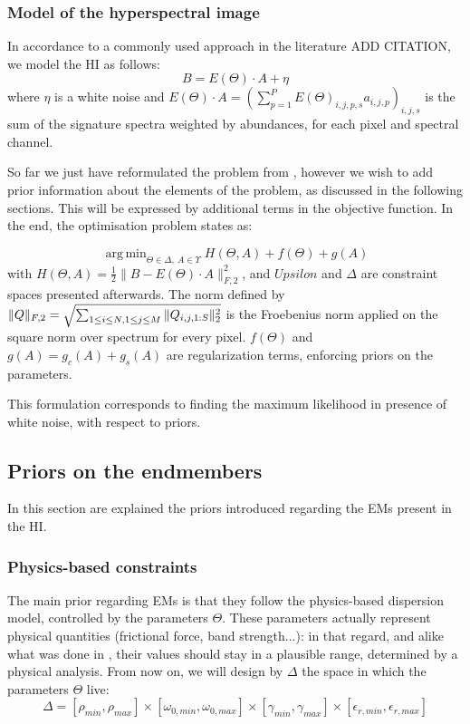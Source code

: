 \documentclass{article}
\DeclareMathOperator*{\argmin}{arg\,min}
\begin{document}
\subsubsection{Model of the hyperspectral image}

In accordance to a commonly used approach in the literature ADD CITATION, we model the HI as follows:
$$B = E(\Theta) \cdot A + \eta$$
where $\eta$ is a white noise and $E(\Theta) \cdot A = \left( \sum_{p=1}^P E(\Theta)_{i,j,p,s} a_{i,j,p} \right)_{i,j,s}$ is the sum of the signature spectra weighted by abundances, for each pixel and spectral channel.

So far we just have reformulated the problem from \cite{janiczek_differentiable_2020}, however we wish to add prior information about the elements of the problem, as discussed in the following sections. This will be expressed by additional terms in the objective function. In the end, the optimisation problem states as:

\begin{equation}
  \label{eq:objective}
  \argmin_{\Theta \in \Delta,\ A \in \Upsilon} H(\Theta, A) + f(\Theta) + g(A)
\end{equation}
with $H(\Theta, A) = \frac{1}{2} \|B - E(\Theta) \cdot A\|_{F, 2}^2$, and $Upsilon$ and $\Delta$ are constraint spaces presented afterwards. The norm defined by $\|Q\|_{F, 2} = \sqrt{\sum_{1 \leq i \leq N,\\1 \leq j \leq M} \|Q_{i, j, 1:S}\|_2^2}$ is the Froebenius norm applied on the square norm over spectrum for every pixel. $f(\Theta)$ and $g(A) = g_c(A) + g_s(A)$ are regularization terms, enforcing priors on the parameters.

This formulation corresponds to finding the maximum likelihood in presence of white noise, with respect to priors.

\subsection{Priors on the endmembers}
In this section are explained the priors introduced regarding the EMs present in the HI.

\subsubsection{Physics-based constraints}

The main prior regarding EMs is that they follow the physics-based dispersion model, controlled by the parameters $\Theta$. These parameters actually represent physical quantities (frictional force, band strength...): in that regard, and alike what was done in \cite{janiczek_differentiable_2020}, their values should stay in a plausible range, determined by a physical analysis. From now on, we will design by $\Delta$ the space in which the parameters $\Theta$ live:
$$\Delta = [\rho_{min}, \rho_{max}] \times [\omega_{0, min}, \omega_{0, max}] \times [\gamma_{min}, \gamma_{max}] \times [\epsilon_{r, min}, \epsilon_{r, max}]$$
\end{document}
